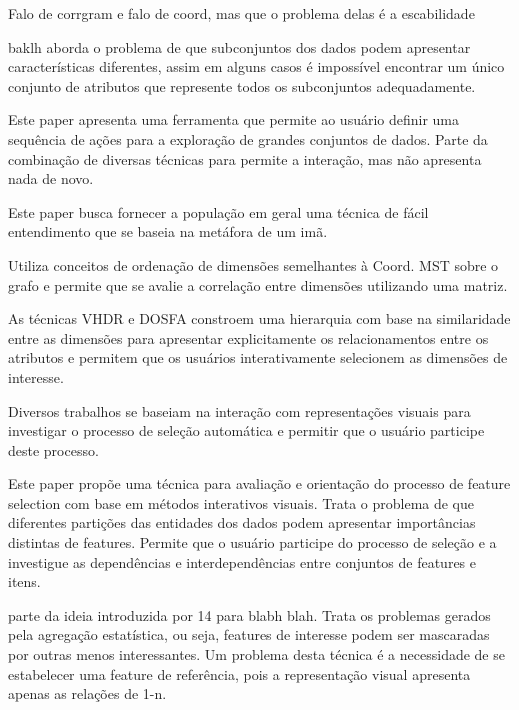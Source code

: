 
Falo de corrgram e falo de coord, mas que o problema delas é a escabilidade

baklh aborda o problema de que subconjuntos dos dados podem apresentar características diferentes, assim em alguns casos é impossível encontrar um único conjunto de atributos que represente todos os subconjuntos adequadamente. 


Este paper apresenta uma ferramenta que permite ao usuário definir uma sequência de ações para a exploração de grandes conjuntos de dados. Parte da combinação de diversas técnicas para permite a interação, mas não apresenta nada de novo.


Este paper busca fornecer a população em geral uma técnica de fácil entendimento que se baseia na metáfora de um imã.


Utiliza conceitos de ordenação de dimensões semelhantes à Coord. MST sobre o grafo e permite que se avalie a correlação entre dimensões utilizando uma matriz.


As técnicas VHDR e DOSFA constroem uma hierarquia com base na similaridade entre as dimensões para apresentar explicitamente os relacionamentos entre os atributos e permitem que os usuários interativamente selecionem as dimensões de interesse.

Diversos trabalhos se baseiam na interação com representações visuais para investigar o processo de seleção automática e permitir que o usuário participe deste processo. 



Este paper propõe uma técnica para avaliação e orientação do processo de feature selection com base em métodos interativos visuais. Trata o problema de que diferentes partições das entidades dos dados podem apresentar  importâncias distintas de features. Permite que o usuário participe do processo de seleção e a investigue as dependências e interdependências entre conjuntos de features e itens.


\cite{May2011} parte da ideia introduzida por 14 para blabh blah. Trata os problemas gerados pela agregação estatística, ou seja, features de interesse podem ser mascaradas por outras menos interessantes. Um problema desta técnica é a necessidade de se estabelecer uma feature de referência, pois a representação visual apresenta apenas as relações de 1-n.

\clearpage
